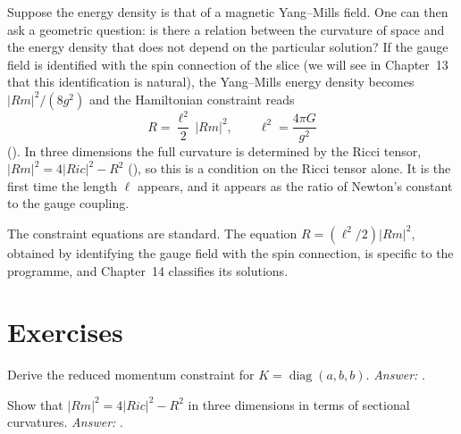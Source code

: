 Suppose the energy density is that of a magnetic Yang--Mills field. One can then ask a geometric question: is there a relation between the curvature of space and the energy density that does not depend on the particular solution? If the gauge field is identified with the spin connection of the slice (we will see in Chapter~13 that this identification is natural), the Yang--Mills energy density becomes $|Rm|^2/(8g^2)$ and the Hamiltonian constraint reads
\[
R=\frac{\ell^2}{2}\,|Rm|^2,\qquad \ell^2=\frac{4\pi G}{g^2}
\]
(). In three dimensions the full curvature is determined by the Ricci tensor, $|Rm|^2=4|Ric|^2-R^2$ (), so this is a condition on the Ricci tensor alone. It is the first time the length $\ell$ appears, and it appears as the ratio of Newton's constant to the gauge coupling.

\begin{standsbox}
The constraint equations are standard. The equation $R=(\ell^2/2)|Rm|^2$, obtained by identifying the gauge field with the spin connection, is specific to the programme, and Chapter~14 classifies its solutions.
\end{standsbox}

\section*{Exercises}
\begin{exercise}Derive the reduced momentum constraint for $K=\operatorname{diag}(a,b,b)$. \emph{Answer:} .\end{exercise}
\begin{exercise}Show that $|Rm|^2=4|Ric|^2-R^2$ in three dimensions in terms of sectional curvatures. \emph{Answer:} .\end{exercise}

